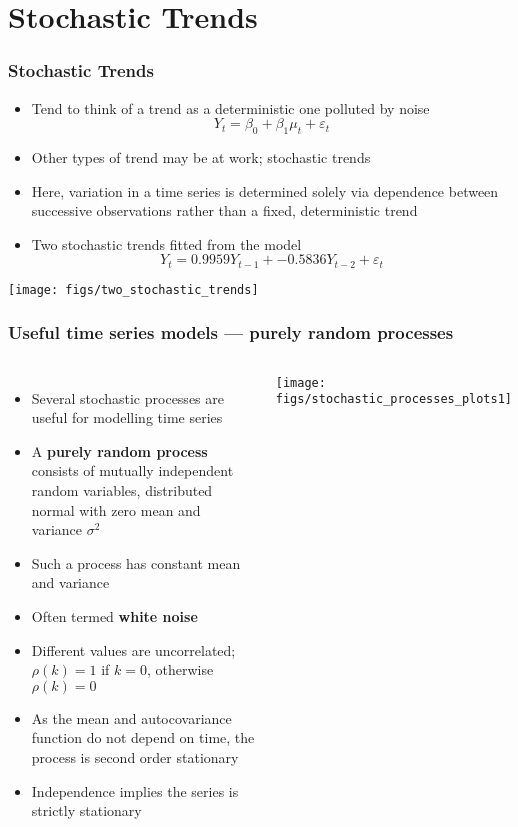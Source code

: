 \documentclass{beamer}
\begin{document}
\section{Stochastic Trends}
\begin{frame}
    \frametitle{Stochastic Trends}
    \begin{itemize}
        \item Tend to think of a trend as a deterministic one polluted by noise
        $$Y_t = \beta_0 + \beta_1 \mu_t + \varepsilon_t$$
        \item Other types of trend may be at work; \alert{stochastic trends}
        \item Here, variation in a time series is determined solely via \alert{dependence} between successive observations rather than a fixed, deterministic trend
        \item Two stochastic trends fitted from the model
        $$Y_t = \mathrm{0.9959} Y_{t-1} + \mathrm{-0.5836} Y_{t-2} + \varepsilon_t$$
    \end{itemize}
    \begin{center}
        \texttt{[image: figs/two\_stochastic\_trends]}
    \end{center}

\end{frame}

\begin{frame}
    \frametitle{Useful time series models --- purely random processes}
    \small
    \begin{columns}
    \column{7cm}
        \begin{itemize}
            \item Several stochastic processes are useful for modelling time series
            \item A \textbf{purely random process} consists of mutually independent random variables, distributed normal with zero mean and variance $\sigma^2$
            \item Such a process has constant mean and variance
            \item Often termed \textbf{white noise}
            \item Different values are uncorrelated; $\rho(k) = 1$ if $k=0$, otherwise $\rho(k) = 0$
            \item As the mean and autocovariance function do not depend on time, the process is second order stationary
            \item Independence implies the series is strictly stationary
        \end{itemize}
    \column{5cm}
    \texttt{[image: figs/stochastic\_processes\_plots1]}
    \end{columns}
    \normalsize
\end{frame}
\end{document}
